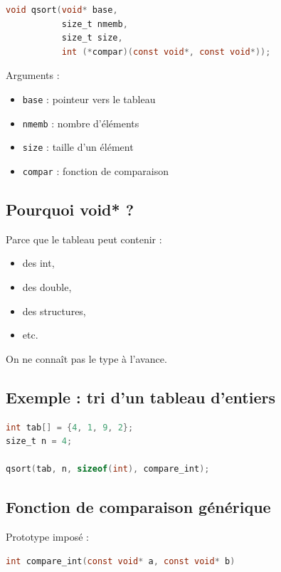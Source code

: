 \begin{lstlisting}[language=C]
void qsort(void* base,
           size_t nmemb,
           size_t size,
           int (*compar)(const void*, const void*));
\end{lstlisting}

Arguments :

\begin{itemize}
\item \texttt{base} : pointeur vers le tableau
\item \texttt{nmemb} : nombre d’éléments
\item \texttt{size} : taille d’un élément
\item \texttt{compar} : fonction de comparaison
\end{itemize}

\subsection{Pourquoi void* ?}

Parce que le tableau peut contenir :

\begin{itemize}
\item des int,
\item des double,
\item des structures,
\item etc.
\end{itemize}

On ne connaît pas le type à l’avance.

\subsection{Exemple : tri d’un tableau d’entiers}

\begin{lstlisting}[language=C]
int tab[] = {4, 1, 9, 2};
size_t n = 4;

qsort(tab, n, sizeof(int), compare_int);
\end{lstlisting}

\subsection{Fonction de comparaison générique}

Prototype imposé :

\begin{lstlisting}[language=C]
int compare_int(const void* a, const void* b)
\end{lstlisting}

